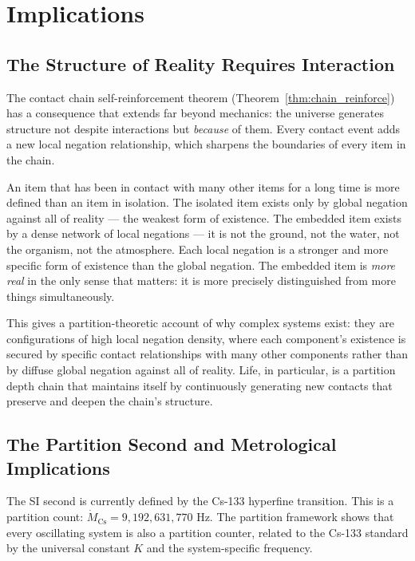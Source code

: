 \documentclass[11pt,twocolumn,a4paper]{article}
\theoremstyle{plain}
\theoremstyle{definition}
\theoremstyle{remark}
\begin{document}
\section{Implications}
\label{sec:implications}

\subsection{The Structure of Reality Requires Interaction}
\label{subsec:structure}

The contact chain self-reinforcement theorem (Theorem~\ref{thm:chain_reinforce})
has a consequence that extends far beyond mechanics: the universe generates
structure not despite interactions but \emph{because} of them. Every contact
event adds a new local negation relationship, which sharpens the boundaries of
every item in the chain.

An item that has been in contact with many other items for a long time is more
defined than an item in isolation. The isolated item exists only by global
negation against all of reality --- the weakest form of existence. The embedded
item exists by a dense network of local negations --- it is not the ground, not
the water, not the organism, not the atmosphere. Each local negation is a
stronger and more specific form of existence than the global negation. The
embedded item is \emph{more real} in the only sense that matters: it is more
precisely distinguished from more things simultaneously.

This gives a partition-theoretic account of why complex systems exist: they are
configurations of high local negation density, where each component's existence
is secured by specific contact relationships with many other components rather
than by diffuse global negation against all of reality. Life, in particular, is
a partition depth chain that maintains itself by continuously generating new
contacts that preserve and deepen the chain's structure.

\subsection{The Partition Second and Metrological Implications}
\label{subsec:metrology}

The SI second is currently defined by the Cs-133 hyperfine transition. This is
a partition count: $\dot{M}_{\mathrm{Cs}} = 9{,}192{,}631{,}770$ Hz. The
partition framework shows that every oscillating system is also a partition
counter, related to the Cs-133 standard by the universal constant $K$ and the
system-specific frequency.
\end{document}
